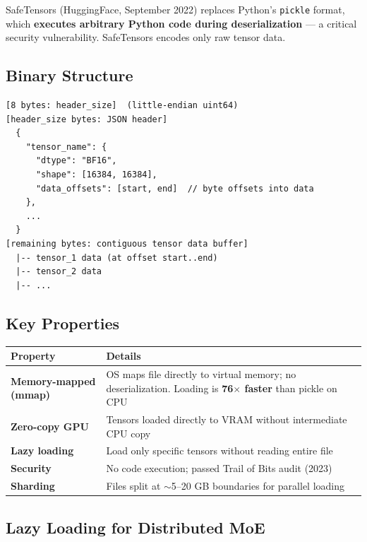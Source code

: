 \documentclass[11pt,a4paper]{article}
\begin{document}
SafeTensors (HuggingFace, September 2022) replaces Python's \texttt{pickle} format, which \textbf{executes arbitrary Python code during deserialization} --- a critical security vulnerability. SafeTensors encodes only raw tensor data.

\subsection{Binary Structure}

\begin{lstlisting}[basicstyle=\ttfamily\small, caption={SafeTensors Binary Layout}]
[8 bytes: header_size]  (little-endian uint64)
[header_size bytes: JSON header]
  {
    "tensor_name": {
      "dtype": "BF16",
      "shape": [16384, 16384],
      "data_offsets": [start, end]  // byte offsets into data
    },
    ...
  }
[remaining bytes: contiguous tensor data buffer]
  |-- tensor_1 data (at offset start..end)
  |-- tensor_2 data
  |-- ...
\end{lstlisting}

\subsection{Key Properties}

\begin{center}
\begin{tabular}{lL{9cm}}
\toprule
\textbf{Property} & \textbf{Details} \\
\midrule
\textbf{Memory-mapped (mmap)} & OS maps file directly to virtual memory; no deserialization. Loading is \textbf{76$\times$ faster} than pickle on CPU \\
\textbf{Zero-copy GPU} & Tensors loaded directly to VRAM without intermediate CPU copy \\
\textbf{Lazy loading} & Load only specific tensors without reading entire file \\
\textbf{Security} & No code execution; passed Trail of Bits audit (2023) \\
\textbf{Sharding} & Files split at $\sim$5--20 GB boundaries for parallel loading \\
\bottomrule
\end{tabular}
\end{center}

\subsection{Lazy Loading for Distributed MoE}
\end{document}
